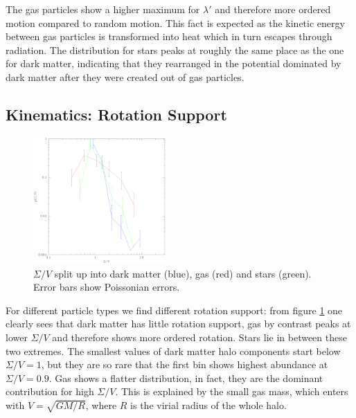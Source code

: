 \documentclass[useAMS,usenatbib]{mn2e}
\begin{document}
The gas particles show a higher maximum for $\lambda'$ and therefore more
ordered motion compared to random motion. This fact is expected as the kinetic
energy between gas particles is transformed into heat which in turn escapes
through radiation. The distribution for stars peaks at roughly the same place
as the one for dark matter, indicating that they rearranged in the potential
dominated by dark matter after they were created out of gas particles.

\subsection{Kinematics: Rotation Support}
%
%
\begin{figure}
  \begin{center}
    \includegraphics[width=0.45\textwidth]{fig/sigmav_dgs/out.eps}
  \end{center}

  \caption{ \label{fig:sigmav_dgs} $\Sigma/V$ split up into dark matter
    (blue), gas (red) and stars (green). Error bars show Poissonian errors.}
\end{figure}
%

For different particle types we find different rotation support: from figure
\ref{fig:sigmav_dgs} one clearly sees that dark matter has little rotation
support, gas by contrast peaks at lower $\Sigma/V$ and therefore shows more
ordered rotation. Stars lie in between these two extremes. The smallest values
of dark matter halo components start below $\Sigma/V=1$, but they are so rare
that the first bin shows highest abundance at $\Sigma/V=0.9$. Gas shows a
flatter distribution, in fact, they are the dominant contribution for high
$\Sigma/V$. This is explained by the small gas mass, which enters with
$V=\sqrt{GM/R}$, where $R$ is the virial radius of the whole halo.
%
%
%
\end{document}
